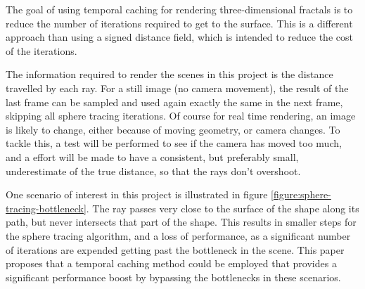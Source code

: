 The goal of using temporal caching for rendering three-dimensional fractals is to reduce the number of iterations required to get to the surface. This is a different approach than using a signed distance field, which is intended to reduce the cost of the iterations.\newline

The information required to render the scenes in this project is the distance travelled by each ray. For a still image (no camera movement), the result of the last frame can be sampled and used again exactly the same in the next frame, skipping all sphere tracing iterations. Of course for real time rendering, an image is likely to change, either because of moving geometry, or camera changes. To tackle this, a test will be performed to see if the camera has moved too much, and a effort will be made to have a consistent, but preferably small, underestimate of the true distance, so that the rays don't overshoot.\newline

One scenario of interest in this project is illustrated in figure \ref{figure:sphere-tracing-bottleneck}. The ray passes very close to the surface of the shape along its path, but never intersects that part of the shape. This results in smaller steps for the sphere tracing algorithm, and a loss of performance, as a significant number of iterations are expended getting past the bottleneck in the scene. This paper proposes that a temporal caching method could be employed that provides a significant performance boost by bypassing the bottlenecks in these scenarios.